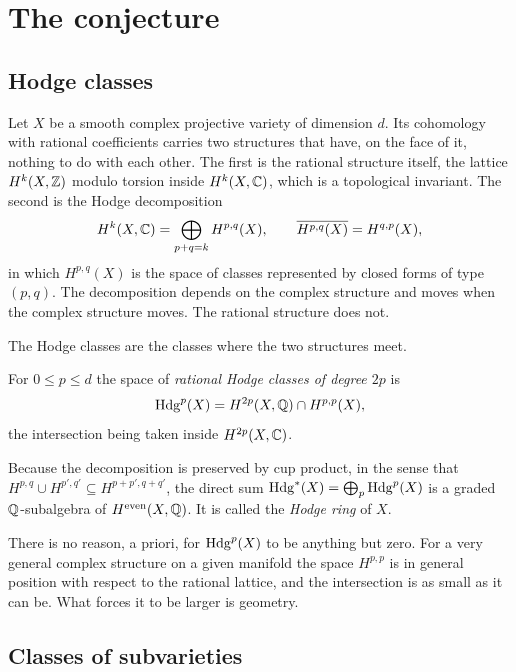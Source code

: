 \chapter{The conjecture}\label{ch:conjecture}

\section{Hodge classes}

Let $X$ be a smooth complex projective variety of dimension $d$. Its
cohomology with rational coefficients carries two structures that have, on
the face of it, nothing to do with each other. The first is the rational
structure itself, the lattice $H^{k}(X,\mathbb{Z})$ modulo torsion inside
$H^{k}(X,\mathbb{C})$, which is a topological invariant. The second is the Hodge
decomposition
\begin{equation}\label{eq:hodgedec}
  H^{k}(X,\mathbb{C})=\bigoplus_{p+q=k}H^{p,q}(X),\qquad
  \overline{H^{p,q}(X)}=H^{q,p}(X),
\end{equation}
in which $H^{p,q}(X)$ is the space of classes represented by closed forms of
type $(p,q)$. The decomposition depends on the complex structure and moves
when the complex structure moves. The rational structure does not.

The Hodge classes are the classes where the two structures meet.

\begin{definition}
For $0\le p\le d$ the space of \emph{rational Hodge classes of degree $2p$} is
\[
  \operatorname{Hdg}^{p}(X)=H^{2p}(X,\mathbb{Q})\cap H^{p,p}(X),
\]
the intersection being taken inside $H^{2p}(X,\mathbb{C})$.
\end{definition}

Because the decomposition is preserved by cup product, in the sense that
$H^{p,q}\cup H^{p',q'}\subseteq H^{p+p',q+q'}$, the direct sum
$\operatorname{Hdg}^{*}(X)=\bigoplus_{p}\operatorname{Hdg}^{p}(X)$ is a graded $\mathbb{Q}$-subalgebra of
$H^{\mathrm{even}}(X,\mathbb{Q})$. It is called the \emph{Hodge ring} of $X$.

There is no reason, a priori, for $\operatorname{Hdg}^{p}(X)$ to be anything but zero.
For a very general complex structure on a given manifold the space
$H^{p,p}$ is in general position with respect to the rational lattice, and
the intersection is as small as it can be. What forces it to be larger is
geometry.

\section{Classes of subvarieties}

